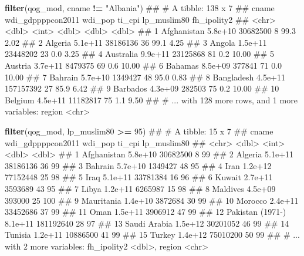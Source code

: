 \documentclass[]{book}
\newenvironment{Shaded}{\begin{snugshade}}{\end{snugshade}}
\newcommand{\KeywordTok}[1]{\textcolor[rgb]{0.13,0.29,0.53}{\textbf{#1}}}
\newcommand{\DecValTok}[1]{\textcolor[rgb]{0.00,0.00,0.81}{#1}}
\newcommand{\StringTok}[1]{\textcolor[rgb]{0.31,0.60,0.02}{#1}}
\newcommand{\OperatorTok}[1]{\textcolor[rgb]{0.81,0.36,0.00}{\textbf{#1}}}
\newcommand{\NormalTok}[1]{#1}
\begin{document}
\begin{Shaded}
\begin{Highlighting}[]
\KeywordTok{filter}\NormalTok{(qog_mod, cname }\OperatorTok{!=}\StringTok{ "Albania"}\NormalTok{)}
\NormalTok{## # A tibble: 138 x 7}
\NormalTok{##          cname wdi_gdppppcon2011   wdi_pop ti_cpi lp_muslim80 fh_ipolity2}
\NormalTok{##          <chr>             <dbl>     <int>  <dbl>       <dbl>       <dbl>}
\NormalTok{##  1 Afghanistan           5.8e+10  30682500      8        99.3        2.02}
\NormalTok{##  2     Algeria           5.1e+11  38186136     36        99.1        4.25}
\NormalTok{##  3      Angola           1.5e+11  23448202     23         0.0        3.25}
\NormalTok{##  4   Australia           9.9e+11  23125868     81         0.2       10.00}
\NormalTok{##  5     Austria           3.7e+11   8479375     69         0.6       10.00}
\NormalTok{##  6     Bahamas           8.5e+09    377841     71         0.0       10.00}
\NormalTok{##  7     Bahrain           5.7e+10   1349427     48        95.0        0.83}
\NormalTok{##  8  Bangladesh           4.5e+11 157157392     27        85.9        6.42}
\NormalTok{##  9    Barbados           4.3e+09    282503     75         0.2       10.00}
\NormalTok{## 10     Belgium           4.5e+11  11182817     75         1.1        9.50}
\NormalTok{## # ... with 128 more rows, and 1 more variables: region <chr>}

\KeywordTok{filter}\NormalTok{(qog_mod, lp_muslim80 }\OperatorTok{>=}\StringTok{ }\DecValTok{95}\NormalTok{)}
\NormalTok{## # A tibble: 15 x 7}
\NormalTok{##               cname wdi_gdppppcon2011   wdi_pop ti_cpi lp_muslim80}
\NormalTok{##               <chr>             <dbl>     <int>  <dbl>       <dbl>}
\NormalTok{##  1      Afghanistan           5.8e+10  30682500      8          99}
\NormalTok{##  2          Algeria           5.1e+11  38186136     36          99}
\NormalTok{##  3          Bahrain           5.7e+10   1349427     48          95}
\NormalTok{##  4             Iran           1.2e+12  77152448     25          98}
\NormalTok{##  5             Iraq           5.1e+11  33781384     16          96}
\NormalTok{##  6           Kuwait           2.7e+11   3593689     43          95}
\NormalTok{##  7            Libya           1.2e+11   6265987     15          98}
\NormalTok{##  8         Maldives           4.5e+09    393000     25         100}
\NormalTok{##  9       Mauritania           1.4e+10   3872684     30          99}
\NormalTok{## 10          Morocco           2.4e+11  33452686     37          99}
\NormalTok{## 11             Oman           1.5e+11   3906912     47          99}
\NormalTok{## 12 Pakistan (1971-)           8.1e+11 181192640     28          97}
\NormalTok{## 13     Saudi Arabia           1.5e+12  30201052     46          99}
\NormalTok{## 14          Tunisia           1.2e+11  10886500     41          99}
\NormalTok{## 15           Turkey           1.4e+12  75010200     50          99}
\NormalTok{## # ... with 2 more variables: fh_ipolity2 <dbl>, region <chr>}


\end{Highlighting}
\end{Shaded}
\end{document}
